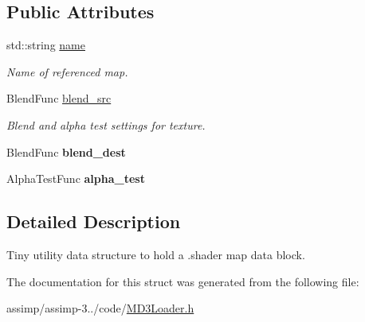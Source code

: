 \subsection*{Public Attributes}
\begin{DoxyCompactItemize}
\item 
\hypertarget{struct_assimp_1_1_q3_shader_1_1_shader_map_block_a4cceafc946d750bbfc13f9aa98779003}{std\+::string \hyperlink{struct_assimp_1_1_q3_shader_1_1_shader_map_block_a4cceafc946d750bbfc13f9aa98779003}{name}}\label{struct_assimp_1_1_q3_shader_1_1_shader_map_block_a4cceafc946d750bbfc13f9aa98779003}

\begin{DoxyCompactList}\small\item\em Name of referenced map. \end{DoxyCompactList}\item 
\hypertarget{struct_assimp_1_1_q3_shader_1_1_shader_map_block_a525011993498d44407fbd4bf83af8613}{Blend\+Func \hyperlink{struct_assimp_1_1_q3_shader_1_1_shader_map_block_a525011993498d44407fbd4bf83af8613}{blend\+\_\+src}}\label{struct_assimp_1_1_q3_shader_1_1_shader_map_block_a525011993498d44407fbd4bf83af8613}

\begin{DoxyCompactList}\small\item\em Blend and alpha test settings for texture. \end{DoxyCompactList}\item 
\hypertarget{struct_assimp_1_1_q3_shader_1_1_shader_map_block_a3e916060f5c6714c554b0c62a08fd33b}{Blend\+Func {\bfseries blend\+\_\+dest}}\label{struct_assimp_1_1_q3_shader_1_1_shader_map_block_a3e916060f5c6714c554b0c62a08fd33b}

\item 
\hypertarget{struct_assimp_1_1_q3_shader_1_1_shader_map_block_afe58491d1f06e9a60f6d944c47cad67a}{Alpha\+Test\+Func {\bfseries alpha\+\_\+test}}\label{struct_assimp_1_1_q3_shader_1_1_shader_map_block_afe58491d1f06e9a60f6d944c47cad67a}

\end{DoxyCompactItemize}


\subsection{Detailed Description}
Tiny utility data structure to hold a .shader map data block. 

The documentation for this struct was generated from the following file\+:\begin{DoxyCompactItemize}
\item 
assimp/assimp-\/3../code/\hyperlink{_m_d3_loader_8h}{M\+D3\+Loader.\+h}\end{DoxyCompactItemize}
